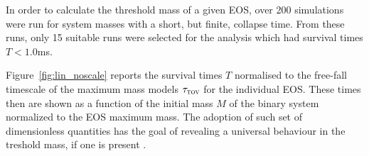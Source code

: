 
In order to calculate the threshold mass of a given EOS, over 200
simulations were run for system masses with a short, but finite, collapse time.
From these runs, only 15 suitable runs were selected for the analysis
which had survival times $T<1.0$ms.

Figure~\ref{fig:lin_noscale} reports the survival times $T$
normalised to the free-fall time\-scale of the maximum mass models
$\tau_{\textsc{tov}}$ for the individual EOS. These times then are shown as a
function of the initial mass $M$ of the binary system normalized to the
EOS maximum mass. The adoption of such set of dimensionless
quantities has the goal of revealing a universal behaviour in the
treshold mass, if one is present \cite{Yagi2013a, Breu2016,Weih2017}.


